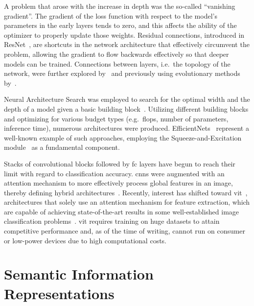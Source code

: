 A problem that arose with the increase in depth was the so-called ``vanishing gradient''. The gradient of the loss function with respect to the model's parameters in the early layers tends to zero, and this affects the ability of the optimizer to properly update those weights.
Residual connections, introduced in ResNet~\cite{DeepResidualLHeKa2015, IdentityMappinHeKa2016}, are shortcuts in the network architecture that effectively circumvent the problem, allowing the gradient to flow backwards effectively so that deeper models can be trained.
Connections between layers, i.e.\ the topology of the network, were further explored by~\cite{DualPathNetwoChen2017, DenselyConnectHuang2016} and previously using evolutionary methods by~\cite{DesigningNeuraMiller1989, EvolvingNeuralStanle2002}.

Neural Architecture Search was employed to search for the optimal width and the depth of a model given a basic building block~\cite{ProgressiveNeuLiuC2017, GeneticCnnXieL2017, LargeScaleEvoReal2017, RegularizedEvoReal2018}. Utilizing different building blocks and optimizing for various budget types (e.g.~\acrshort{flops}, number of parameters, inference time), numerous architectures were produced.
EfficientNets~\cite{EfficientnetRTanM2019, Efficientnetv2TanM2021} represent a well-known example of such approaches, employing the Squeeze-and-Excitation module~\cite{SqueezeAndExcHuJi2017} as a fundamental component.

Stacks of convolutional blocks followed by \acrfull{fc} layers have begun to reach their limit with regard to classification accuracy. \acrshort{cnn}s were augmented with an attention mechanism to more effectively process global features in an image, thereby defining hybrid architectures~\cite{SpatialTransfoJaderb2015, LookAndThinkCaoC2015, ShowAttendAnXuKe2015, ScaCnnSpatiaChen2016}.
Recently, interest has shifted toward \acrfull{vit}~\cite{AnImageIsWorDosovi2020}, architectures that solely use an attention mechanism for feature extraction, which are capable of achieving state-of-the-art results in some well-established image classification problems~\cite{TransformersInKhan2021, ASurveyOnVisHanK2023}. \acrshort{vit} requires training on huge datasets to attain competitive performance and, as of the time of writing, cannot run on consumer or low-power devices due to high computational costs.

\section{Semantic Information Representations}
\label{sec:semantic-information-sources}

